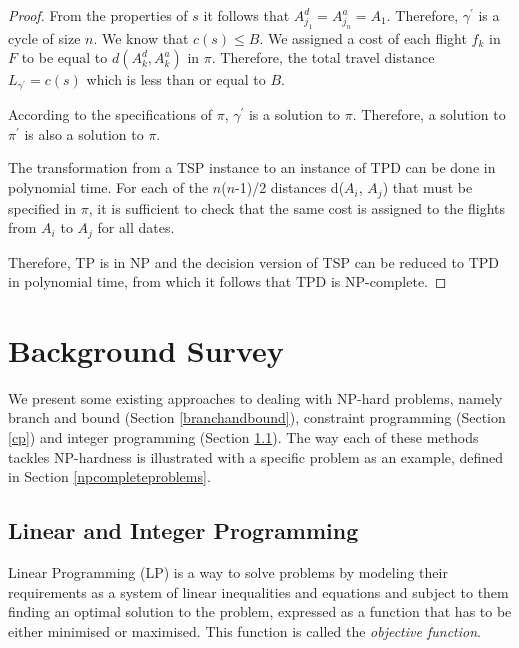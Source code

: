 \documentclass{mprop}
\theoremstyle{definition}
\begin{document}
\begin{proof}
From the properties of $s$ it follows that $A^{d}_{j_{1}} = A^{a}_{j_{n}} = A_{1}$. Therefore, $\gamma^{\prime}$ is a cycle of size $n$. We know that $c(s) \leq B$. We assigned a cost of each flight $f_{k}$ in $F$ to be equal to $d(A^{d}_{k}, A^{a}_{k})$ in $\pi$. Therefore, the total travel distance $L_{\gamma^{\prime}} = c(s)$ which is less than or equal to $B$.

According to the specifications of $\pi$, $\gamma^{\prime}$ is a solution to $\pi$. Therefore, a solution to $\pi^{\prime}$ is also a solution to $\pi$.

The transformation from a TSP instance to an instance of TPD can be done in polynomial time. For each of the $n$($n$-1)/2 distances d($A_{i}$, $A_{j}$) that must be specified in $\pi$, it is sufficient to check that the same cost is assigned to the flights from $A_{i}$ to $A_{j}$ for all dates.

Therefore, TP is in NP and the decision version of TSP can be reduced to TPD in polynomial time, from which it follows that TPD is NP-complete.

\end{proof}

\section{Background Survey}


\label{sec:existingwork}
We present some existing approaches to dealing with NP-hard problems, namely branch and bound (Section \ref{branchandbound}), constraint programming (Section \ref{cp}) and integer programming (Section \ref{ip}). The way each of these methods tackles NP-hardness is illustrated with a specific problem as an example, defined in Section \ref{npcompleteproblems}.


\subsection{Linear and Integer Programming}
\label{ip}

Linear Programming (LP) is a way to solve problems by modeling their requirements as a system of linear inequalities and equations and subject to them finding an optimal solution to the problem, expressed as a function that has to be either minimised or maximised. This function is called the \textit{objective function}.
\end{document}
